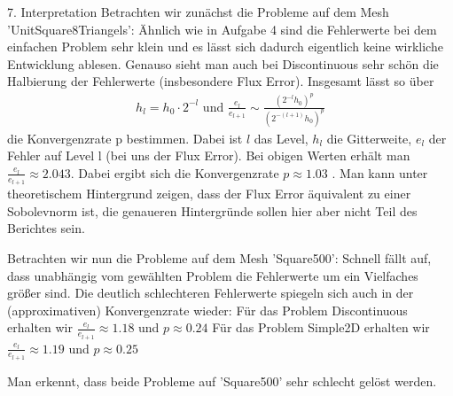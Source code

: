\documentclass[12pt,a4paper]{scrartcl}
\numberwithin{equation}{section}
\begin{document}
\begin{enumerate}[label=(\roman*)]
7. Interpretation \newline
Betrachten wir zunächst die Probleme auf dem Mesh 'UnitSquare8Triangels': \newline
Ähnlich wie in Aufgabe 4 sind die Fehlerwerte bei dem einfachen Problem sehr klein und es lässt sich dadurch eigentlich keine wirkliche Entwicklung ablesen. Genauso sieht man auch bei Discontinuous sehr schön die Halbierung der Fehlerwerte (insbesondere Flux Error). Insgesamt lässt so über 
\begin{align*}
h_l = h_0 \cdot 2^{-l} \text{ und } \frac{e_l}{e_{l+1}} \sim \frac{(2^{-l}h_0)^{p}}{(2^{-(l+1)}h_0)^{p}} %
\end{align*}
die Konvergenzrate p bestimmen. Dabei ist $l$ das Level, $h_l$ die Gitterweite, $e_l$ der Fehler auf Level l (bei uns der Flux Error). 
Bei obigen Werten erhält man $ \frac{e_l}{e_{l+1}} \approx 2.043 $. \newline
Dabei ergibt sich die Konvergenzrate $p \approx 1.03$ .
Man kann unter theoretischem Hintergrund zeigen, dass der Flux Error äquivalent zu einer Sobolevnorm ist, die genaueren Hintergründe sollen hier aber nicht Teil des Berichtes sein.

Betrachten wir nun die Probleme auf dem Mesh 'Square500': Schnell fällt auf, dass unabhängig vom gewählten Problem die Fehlerwerte um ein Vielfaches größer sind. Die deutlich schlechteren Fehlerwerte spiegeln sich auch in der (approximativen) Konvergenzrate wieder: \newline
Für das Problem Discontinuous erhalten wir $ \frac{e_l}{e_{l+1}} \approx 1.18 $ und $p \approx 0.24$ \newline
Für das Problem Simple2D erhalten wir $ \frac{e_l}{e_{l+1}} \approx 1.19 $ und $p \approx 0.25$ \newline

Man erkennt, dass beide Probleme auf 'Square500' sehr schlecht gelöst werden.


\end{enumerate}
\end{document}
